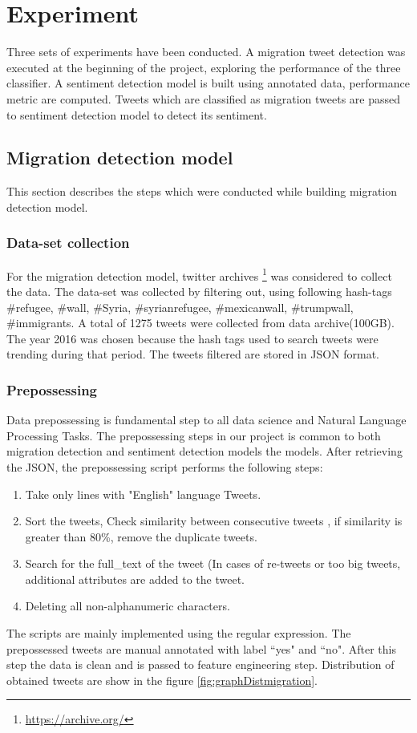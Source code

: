 \chapter{Experiment}\label{chap:experiment}

Three sets of experiments have been conducted. A migration tweet detection was executed at the beginning of the project, exploring the performance of the three classifier. A sentiment detection model is built using annotated data, performance metric are computed. Tweets which are classified as migration tweets are passed to sentiment detection model to detect its sentiment.

\section{Migration detection model}
This section describes the steps which were conducted while building migration detection model.
\subsection{Data-set collection}

For the migration detection model, twitter archives \footnote{\url{https://archive.org/}} was considered to collect the data.
The data-set was collected by filtering out, using following hash-tags
\#refugee, \#wall, \#Syria, \#syrianrefugee,
\#mexicanwall, \#trumpwall, \#immigrants. A total of 1275 tweets were collected from data archive(100GB). The year 2016 was chosen because the hash tags used to search tweets were trending during that period. The tweets filtered are stored in JSON format.



\subsection{Prepossessing} \label{sssec:preprocessing}

Data prepossessing is fundamental step to all data science and
Natural Language Processing Tasks. The prepossessing steps in
our project is common to both migration detection and sentiment detection models the models. After retrieving the JSON, the prepossessing script performs the following steps:
\begin{enumerate}
    \item Take only lines with "English" language Tweets.
    \item Sort the tweets, Check similarity between consecutive tweets , if similarity is greater than 80\%, remove the duplicate tweets.
    \item Search for the full\_text of the tweet (In cases of re-tweets or too big tweets, additional attributes are added to the tweet.
    \item Deleting all non-alphanumeric characters.
\end{enumerate}
The scripts are mainly implemented using the regular expression. The prepossessed tweets are manual annotated with label ``yes" and ``no". After this step the data is clean and is passed to feature engineering step. Distribution of obtained tweets are show in the figure \ref{fig:graphDistmigration}.

